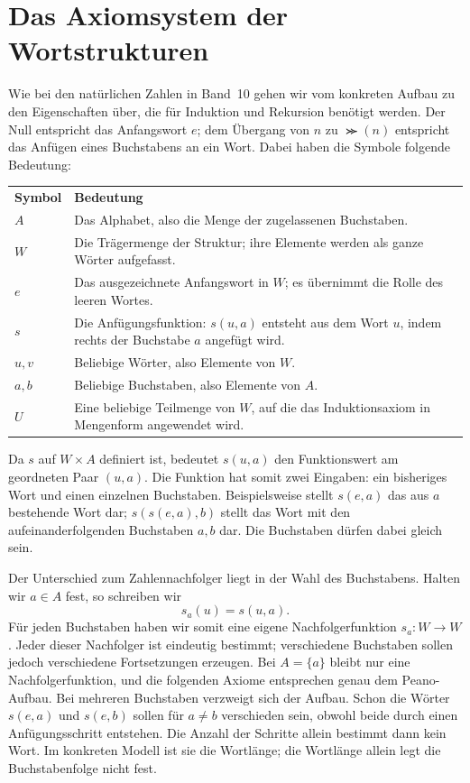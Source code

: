 \section{Das Axiomsystem der Wortstrukturen}

Wie bei den natürlichen Zahlen in Band~10 gehen wir vom konkreten
Aufbau zu den Eigenschaften über, die für Induktion und Rekursion
benötigt werden. Der Null entspricht das Anfangswort \(e\); dem
Übergang von \(n\) zu \(\Succ(n)\) entspricht das Anfügen eines
Buchstabens an ein Wort. Dabei haben die Symbole folgende Bedeutung:

\begingroup
\renewcommand{\arraystretch}{1.15}
\noindent\begin{tabular}{@{}p{.14\linewidth}p{.81\linewidth}@{}}
\textbf{Symbol} & \textbf{Bedeutung} \\
\(A\) & Das Alphabet, also die Menge der zugelassenen Buchstaben. \\
\(W\) & Die Trägermenge der Struktur; ihre Elemente werden als ganze Wörter aufgefasst. \\
\(e\) & Das ausgezeichnete Anfangswort in \(W\); es übernimmt die Rolle des leeren Wortes. \\
\(s\) & Die Anfügungsfunktion: \(s(u,a)\) entsteht aus dem Wort \(u\), indem rechts der Buchstabe \(a\) angefügt wird. \\
\(u,v\) & Beliebige Wörter, also Elemente von \(W\). \\
\(a,b\) & Beliebige Buchstaben, also Elemente von \(A\). \\
\(U\) & Eine beliebige Teilmenge von \(W\), auf die das Induktionsaxiom in Mengenform angewendet wird.
\end{tabular}\par
\endgroup

Da \(s\) auf \(W\times A\) definiert ist, bedeutet \(s(u,a)\) den
Funktionswert am geordneten Paar \((u,a)\). Die Funktion hat somit zwei
Eingaben: ein bisheriges Wort und einen einzelnen Buchstaben.
Beispielsweise stellt \(s(e,a)\) das aus \(a\) bestehende Wort dar;
\(s(s(e,a),b)\) stellt das Wort mit den aufeinanderfolgenden Buchstaben
\(a,b\) dar. Die Buchstaben dürfen dabei gleich sein.

Der Unterschied zum Zahlennachfolger liegt in der Wahl des Buchstabens.
Halten wir \(a\in A\) fest, so schreiben wir
\[
 s_a(u)=s(u,a).
\]
Für jeden Buchstaben haben wir somit eine eigene Nachfolgerfunktion
\(s_a\colon W\to W\). Jeder dieser Nachfolger ist eindeutig bestimmt;
verschiedene Buchstaben sollen jedoch verschiedene Fortsetzungen
erzeugen. Bei \(A=\{a\}\) bleibt nur eine Nachfolgerfunktion, und die
folgenden Axiome entsprechen genau dem Peano-Aufbau. Bei mehreren
Buchstaben verzweigt sich der Aufbau. Schon die Wörter \(s(e,a)\) und
\(s(e,b)\) sollen für \(a\ne b\) verschieden sein, obwohl beide durch
einen Anfügungsschritt entstehen. Die Anzahl der Schritte allein
bestimmt dann kein Wort. Im konkreten Modell ist sie die Wortlänge;
die Wortlänge allein legt die Buchstabenfolge nicht fest.


